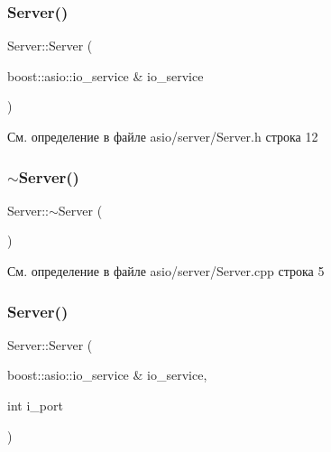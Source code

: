 \subsubsection{\texorpdfstring{Server()}{Server()}\hspace{0.1cm}{\footnotesize\ttfamily [1/2]}}
{\footnotesize\ttfamily Server\+::\+Server (\begin{DoxyParamCaption}\item[{boost\+::asio\+::io\+\_\+service \&}]{io\+\_\+service }\end{DoxyParamCaption})\hspace{0.3cm}{\ttfamily [inline]}}



См. определение в файле asio/server/\+Server.\+h строка 12

\mbox{\label{class_server_a4b3aa2579cb1c8cd1d069582c14d0fa6}} 
\subsubsection{\texorpdfstring{$\sim$Server()}{~Server()}\hspace{0.1cm}{\footnotesize\ttfamily [1/2]}}
{\footnotesize\ttfamily Server\+::$\sim$\+Server (\begin{DoxyParamCaption}{ }\end{DoxyParamCaption})}



См. определение в файле asio/server/\+Server.\+cpp строка 5

\mbox{\label{class_server_a64e726d6d9e85b00ba86488badb330d4}} 
\subsubsection{\texorpdfstring{Server()}{Server()}\hspace{0.1cm}{\footnotesize\ttfamily [2/2]}}
{\footnotesize\ttfamily Server\+::\+Server (\begin{DoxyParamCaption}\item[{boost\+::asio\+::io\+\_\+service \&}]{io\+\_\+service,  }\item[{int}]{i\+\_\+port }\end{DoxyParamCaption})\hspace{0.3cm}{\ttfamily [inline]}}



